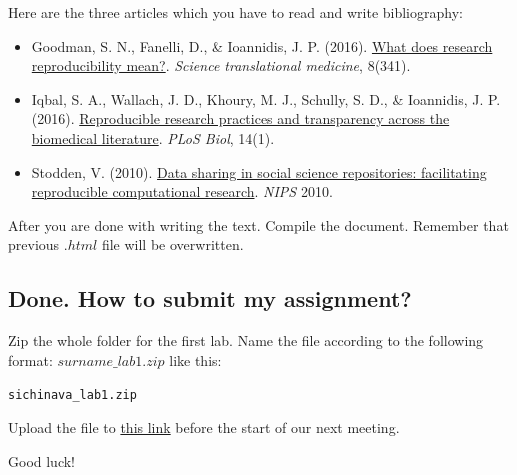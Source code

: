 \documentclass{article}\usepackage[]{graphicx}\usepackage[]{color}
\makeatletter
\newcommand{\hlstd}[1]{\textcolor[rgb]{0.345,0.345,0.345}{#1}}%
\newenvironment{kframe}{%
 \def\at@end@of@kframe{}%
 \ifinner\ifhmode%
  \def\at@end@of@kframe{\end{minipage}}%
  \begin{minipage}{\columnwidth}%
 \fi\fi%
 \def\FrameCommand##1{\hskip\@totalleftmargin \hskip-\fboxsep
 \colorbox{shadecolor}{##1}\hskip-\fboxsep
     \hskip-\linewidth \hskip-\@totalleftmargin \hskip\columnwidth}%
 \MakeFramed {\advance\hsize-\width
   \@totalleftmargin\z@ \linewidth\hsize
   \@setminipage}}%
 {\par\unskip\endMakeFramed%
 \at@end@of@kframe}
\newenvironment{knitrout}{}{} %
\makeatother
\begin{document}
Here are the three articles which you have to read and write bibliography:

\begin{itemize}
\item Goodman, S. N., Fanelli, D., & Ioannidis, J. P. (2016). \href{https://www.dropbox.com/s/4io57pvabqw539s/Goodman%2C%202016.pdf?dl=0)}{What does research reproducibility mean?}. \emph{Science translational medicine}, 8(341).
\item  Iqbal, S. A., Wallach, J. D., Khoury, M. J., Schully, S. D., & Ioannidis, J. P. (2016). \href{https://www.dropbox.com/s/dgl3tbskfjjn5ib/iqbal_et_al%2C%202016.PDF?dl=0}{Reproducible research practices and transparency across the biomedical literature}. \emph{PLoS Biol}, 14(1).
\item  Stodden, V. (2010). \href{https://www.dropbox.com/s/uh7vd6diud8tcyu/Stodden%2C%202010.pdf?dl=0}{Data sharing in social science repositories: facilitating reproducible computational research}. \emph{NIPS} 2010.
\end{itemize}

After you are done with writing the text. Compile the document. Remember that previous $.html$ file will be overwritten.

\subsection*{Done. How to submit my assignment?}

Zip the whole folder for the first lab. Name the file according to the following format: $surname\_lab1.zip$ like this:

\begin{knitrout}
\color{fgcolor}\begin{kframe}
\begin{alltt}
\hlstd{sichinava_lab1.zip}
\end{alltt}
\end{kframe}
\end{knitrout}

Upload the file to \href{https://www.dropbox.com/request/fJXwi6SVJ0D7r1WvxyG9}{this link} before the start of our next meeting.


Good luck!
\end{document}
